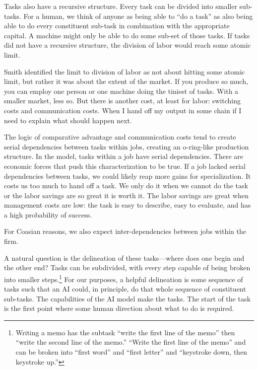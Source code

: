 \documentclass{article}
\begin{document}
Tasks also have a recursive structure.
Every task can be divided into smaller sub-tasks.
For a human, we think of anyone as being able to ``do a task'' as also being able to do every constituent sub-task in combination with the appropriate capital.
A machine might only be able to do some sub-set of those tasks. 
If tasks did not have a recursive structure, the division of labor would reach some atomic limit. 

Smith identified the limit to division of labor as not about hitting some atomic limit, but rather it was about the extent of the market. 
If you produce so much, you can employ one person or one machine doing the tiniest of tasks.
With a smaller market, less so.
But there is another cost, at least for labor: switching costs and communication costs.
When I hand off my output in some chain if I need to explain what should happen next.

The logic of comparative advantage and communication costs tend to create serial dependencies between tasks within jobs, creating an o-ring-like production structure.
In the model, tasks within a job have serial dependencies. 
There are economic forces that push this characterization to be true. 
If a job lacked serial dependencies between tasks, we could likely reap more gains for specialization.
It costs us too much to hand off a task.
We only do it when we cannot do the task or the labor savings are so great it is worth it. 
The labor savings are great when management costs are low: the task is easy to describe, easy to evaluate, and has a high probability of success. 

For Coasian reasons, we also expect inter-dependencies between jobs within the firm.

A natural question is the delineation of these tasks---where does one begin and the other end? 
Tasks can be subdivided, with every step capable of being broken into smaller steps.\footnote{
    Writing a memo has the subtask ``write the first line of the memo'' then ``write the second line of the memo.''
    ``Write the first line of the memo'' and can be broken into ``first word'' and ``first letter'' and ``keystroke down, then keystroke up.''    
}
For our purposes, a helpful delineation is some sequence of tasks such that an AI could, in principle, do that whole sequence of constituent sub-tasks.
The capabilities of the AI model make the tasks. 
The start of the task is the first point where some human direction about what to do is required. 
\end{document}
